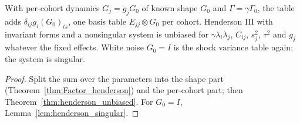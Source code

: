 \begin{theorem}\label{thm:Factor_hendersonG}
  \leanok
  With per-cohort dynamics $G_j = g_jG_0$ of known shape $G_0$ and $\Gamma = \gamma\Gamma_0$, the
  table adds $\delta_{ij}g_i(G_0)_{ts}$, one basis table $E_{jj}\otimes G_0$ per cohort. Henderson
  III with invariant forms and a nonsingular system is unbiased for $\gamma\lambda_i\lambda_j$,
  $C_{ij}$, $s_j^2$, $\tau^2$ and $g_j$ whatever the fixed effects. White noise $G_0 = I$ is the
  shock variance table again: the system is singular.
\end{theorem}
\begin{proof}
  \leanok
  Split the sum over the parameters into the shape part (Theorem~\ref{thm:Factor_henderson}) and
  the per-cohort part; then Theorem~\ref{thm:henderson_unbiased}. For $G_0 = I$,
  Lemma~\ref{lem:henderson_singular}.
\end{proof}
